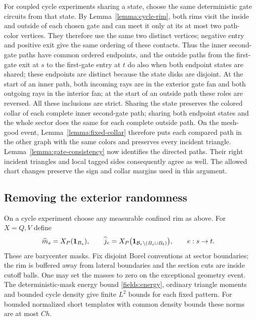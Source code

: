For coupled cycle experiments sharing a state, choose the same
deterministic gate circuits from that state.  By
Lemma~\ref{lemma:cycle-rim}, both rims visit the inside and outside of
each chosen gate and can meet it only at its at most two path-color
vertices.  They therefore use the same two distinct vertices; negative
entry and positive exit give the same ordering of these contacts.  Thus
the inner second-gate paths have common ordered endpoints, and the
outside paths from the first-gate exit at $s$ to the first-gate entry at
$t$ do also when both endpoint states are shared; these endpoints are
distinct because the state disks are disjoint.  At the start of an
inner path, both incoming rays are in the exterior gate fan and both
outgoing rays in the interior fan; at the start of an outside path these
roles are reversed.  All these inclusions are strict.  Sharing the state
preserves the colored collar of each complete inner second-gate path;
sharing both endpoint states and the whole sector does the same for
each complete outside path.  On the mesh-good event,
Lemma~\ref{lemma:fixed-collar} therefore puts each compared path in the
other graph with the same colors and preserves every incident triangle.
Lemma~\ref{lemma:gate-consistency} now identifies the directed paths.
Their right incident triangles and local tagged sides consequently
agree as well.  The allowed chart changes preserve the sign and collar
margins used in this argument.

\subsection{Removing the exterior randomness}

On a cycle experiment choose any measurable confined rim as above.
For $X=Q,V$ define
\begin{equation}\label{plug:masses}
 \widehat m_s=X_P(\mathbf 1_{B_s}),\qquad
 \widehat j_e=X_P\bigl(\mathbf 1_{\mathcal B_e\setminus(B_s\cup B_t)}\bigr),
 \qquad e:s\to t.
\end{equation}
These are barycenter masks.  Fix disjoint Borel conventions at sector
boundaries; the rim is buffered away from lateral boundaries and the
section cuts are inside cutoff balls.  One may set the masses to zero
on the exceptional geometry event.  The deterministic-mask energy
bound \eqref{fields:energy}, ordinary triangle moments and bounded cycle
density give finite $L^2$ bounds for each fixed pattern.  For bounded
normalized short templates with common density bounds these norms are
at most $C h$.

